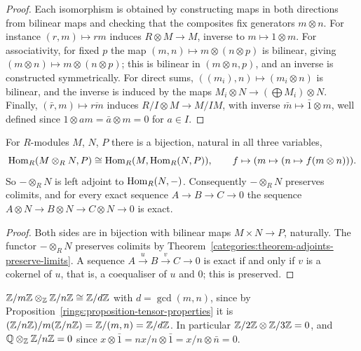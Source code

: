 \begin{proof}
Each isomorphism is obtained by constructing maps in both directions from bilinear
maps and checking that the composites fix generators $m \otimes n$. For instance
$(r, m) \mapsto rm$ induces $R \otimes M \to M$, inverse to $m \mapsto 1 \otimes m$. For
associativity, for fixed $p$ the map $(m, n) \mapsto m \otimes (n \otimes p)$ is bilinear, giving
$(m \otimes n) \mapsto m \otimes (n \otimes p)$; this is bilinear in $(m \otimes n, p)$, and an inverse
is constructed symmetrically. For direct sums, $((m_i), n) \mapsto (m_i \otimes n)$ is bilinear,
and the inverse is induced by the maps $M_i \otimes N \to (\bigoplus M_i) \otimes N$. Finally,
$(\bar r, m) \mapsto \overline{rm}$ induces $R/I \otimes M \to M/IM$, with inverse
$\bar m \mapsto \bar 1 \otimes m$, well defined since $1 \otimes am = \bar a \otimes m = 0$ for $a \in I$.
\end{proof}

\begin{theorem}\label{rings:theorem-tensor-hom}
For $R$-modules $M$, $N$, $P$ there is a bijection, natural in all three variables,
\[
\operatorname{Hom}_R(M \otimes_R N, P) \cong \operatorname{Hom}_R(M, \operatorname{Hom}_R(N, P)), \qquad f \mapsto (m \mapsto (n \mapsto f(m \otimes n))).
\]
So $- \otimes_R N$ is left adjoint to $\operatorname{Hom}_R(N, -)$. Consequently $- \otimes_R N$ preserves
colimits, and for every exact sequence $A \to B \to C \to 0$ the sequence
$A \otimes N \to B \otimes N \to C \otimes N \to 0$ is exact.
\end{theorem}

\begin{proof}
Both sides are in bijection with bilinear maps $M \times N \to P$, naturally. The functor
$- \otimes_R N$ preserves colimits by Theorem~\ref{categories:theorem-adjoints-preserve-limits}.
A sequence $A \xrightarrow{u} B \xrightarrow{v} C \to 0$ is exact if and only if $v$ is a cokernel of $u$,
that is, a coequaliser of $u$ and $0$; this is preserved.
\end{proof}

\begin{example}\label{rings:example-tensor-cyclic}
$\mathbb{Z}/m\mathbb{Z} \otimes_{\mathbb{Z}} \mathbb{Z}/n\mathbb{Z} \cong \mathbb{Z}/d\mathbb{Z}$ with $d = \gcd(m, n)$, since by
Proposition~\ref{rings:proposition-tensor-properties} it is
$(\mathbb{Z}/n\mathbb{Z})/m(\mathbb{Z}/n\mathbb{Z}) = \mathbb{Z}/(m, n) = \mathbb{Z}/d\mathbb{Z}$. In particular
$\mathbb{Z}/2\mathbb{Z} \otimes \mathbb{Z}/3\mathbb{Z} = 0$, and $\mathbb{Q} \otimes_{\mathbb{Z}} \mathbb{Z}/n\mathbb{Z} = 0$ since $x \otimes \bar 1 = nx/n \otimes \bar 1 = x/n \otimes \bar n = 0$.
\end{example}

